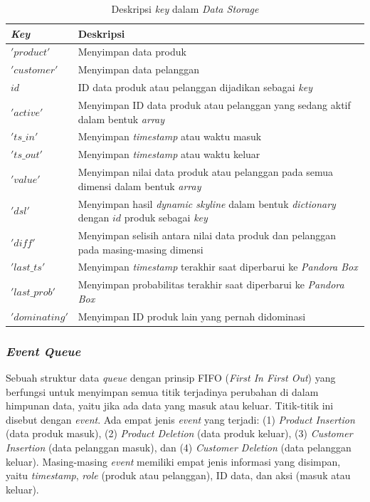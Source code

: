 \documentclass[conference]{IEEEtran}
\begin{document}
\begin{table}[htbp]
	\caption{Deskripsi \textit{key} dalam \textit{Data Storage}}
	\begin{center}
		\begin{tabular}{| p{2.5cm} | p{4.5cm} |}
			\hline
			\textbf{\textit{Key}} & \textbf{Deskripsi} \\ \hline
			$'product'$ & Menyimpan data produk \\ \hline
			$'customer'$ & Menyimpan data pelanggan \\ \hline
			$id$ & ID data produk atau pelanggan dijadikan sebagai \textit{key} \\ \hline
			$'active'$ & Menyimpan ID data produk atau pelanggan yang sedang aktif dalam bentuk \textit{array} \\ \hline
			$'ts\_in'$ & Menyimpan \textit{timestamp} atau waktu masuk \\ \hline
			$'ts\_out'$ & Menyimpan \textit{timestamp} atau waktu keluar \\ \hline
			$'value'$ & Menyimpan nilai data produk atau pelanggan pada semua dimensi dalam bentuk \textit{array}\\ \hline
			$'dsl'$ & Menyimpan hasil \textit{dynamic skyline} dalam bentuk \textit{dictionary} dengan $id$ produk sebagai \textit{key}\\ \hline
			$'diff'$ & Menyimpan selisih antara nilai data produk dan pelanggan pada masing-masing dimensi \\ \hline
			$'last\_ts'$ & Menyimpan \textit{timestamp} terakhir saat diperbarui ke \textit{Pandora Box}\\ \hline
			$'last\_prob'$ & Menyimpan probabilitas terakhir saat diperbarui ke \textit{Pandora Box}\\ \hline
			$'dominating'$ & Menyimpan ID produk lain yang pernah didominasi\\ \hline
		\end{tabular}
		\label{tab:desc-key}
	\end{center}
\end{table}

\subsubsection{\textbf{\textit{Event Queue}}}
Sebuah struktur data \textit{queue} dengan prinsip FIFO (\textit{First In First Out}) yang berfungsi untuk menyimpan semua titik terjadinya perubahan di dalam himpunan data, yaitu jika ada data yang masuk atau keluar. Titik-titik ini disebut dengan \textit{event}. Ada empat jenis \textit{event} yang terjadi: (1) \textit{Product Insertion} (data produk masuk), (2) \textit{Product Deletion} (data produk keluar), (3) \textit{Customer Insertion} (data pelanggan masuk), dan (4) \textit{Customer Deletion} (data pelanggan keluar). Masing-masing \textit{event} memiliki empat jenis informasi yang disimpan, yaitu \textit{timestamp}, \textit{role} (produk atau pelanggan), ID data, dan aksi (masuk atau keluar).
\end{document}
